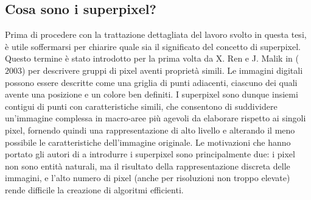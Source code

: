 \documentclass[12pt,a4paper,oneside]{article}
\begin{document}
\subsection{Cosa sono i superpixel?}
Prima di procedere con la trattazione dettagliata del lavoro svolto in questa tesi, è utile soffermarsi per chiarire quale sia il significato del concetto di superpixel. Questo termine è stato introdotto per la prima volta da X. Ren e J. Malik in \cite{SUPERPIXEL} ($2003$) per descrivere gruppi di pixel aventi proprietà simili. Le immagini digitali possono essere descritte come una griglia di punti adiacenti, ciascuno dei quali avente una posizione e un colore ben definiti. I superpixel sono dunque insiemi contigui di punti con caratteristiche simili, che consentono di suddividere un'immagine complessa in macro-aree più agevoli da elaborare rispetto ai singoli pixel, fornendo quindi una rappresentazione di alto livello e alterando il meno possibile le caratteristiche dell'immagine originale. Le motivazioni che hanno portato gli autori di \cite{SUPERPIXEL} a introdurre i superpixel sono principalmente due: i pixel non sono entità naturali, ma il risultato della rappresentazione discreta delle immagini, e l'alto numero di pixel (anche per risoluzioni non troppo elevate) rende difficile la creazione di algoritmi efficienti.
\end{document}
